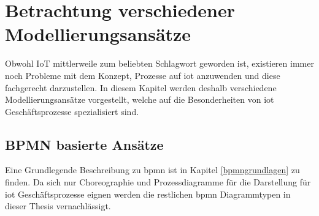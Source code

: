 \documentclass[a4paper, 12pt, twoside, headsepline=true]{scrartcl} %
\begin{document}
\section{Betrachtung verschiedener Modellierungsansätze}\label{modellierungsansätze}
Obwohl IoT mittlerweile zum beliebten Schlagwort geworden ist, existieren immer noch Probleme mit dem Konzept, Prozesse auf \ac{iot} anzuwenden und diese fachgerecht darzustellen. In diesem Kapitel werden deshalb verschiedene Modellierungsansätze vorgestellt, welche auf die Besonderheiten von \ac{iot} Geschäftsprozesse spezialisiert sind.

\subsection{BPMN basierte Ansätze}
Eine Grundlegende Beschreibung zu \ac{bpmn} ist in Kapitel \ref{bpmngrundlagen} zu finden. Da sich nur Choreographie und Prozessdiagramme für die Darstellung für \ac{iot} Geschäftsprozesse eignen werden die restlichen \ac{bpmn} Diagrammtypen in dieser Thesis vernachlässigt.
\end{document}
